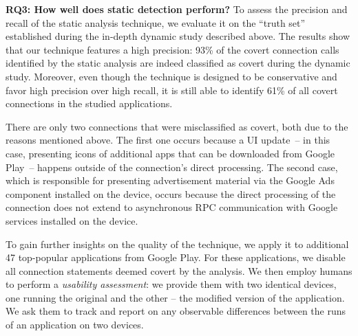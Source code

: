 %



\noindent 
{\bf RQ3: How well does static detection perform?}
To assess the precision and recall of the static analysis technique, we evaluate it on the ``truth set'' established during the in-depth dynamic study described above. %
The results show that our technique features a high precision: 93\% of the covert connection calls identified by the static analysis are indeed classified as covert during the dynamic study. 
Moreover, even though the technique is designed to be conservative and favor high precision over high recall, 
it is still able to identify 61\% of all covert connections in the studied applications.

There are only two connections that were misclassified as covert, both due to the reasons mentioned above. The first one occurs because a UI update~-- in this case, presenting icons of additional apps that can be downloaded from Google Play~-- happens outside of the connection's direct processing. The second case, which is responsible for presenting advertisement material via the Google Ads component installed on the device, occurs because the direct processing of the connection does not extend to asynchronous RPC communication with Google services installed on the device. 



To gain further insights on the quality of the technique, we apply it to additional 47 top-popular applications from Google Play. For these applications, we disable all connection statements deemed covert by the analysis. We then employ humans to perform a \emph{usability assessment}: we provide them with two identical devices, one running the original and the other -- the modified version of the application. We ask them to track and report on any observable differences between the runs of an application on two devices. 


